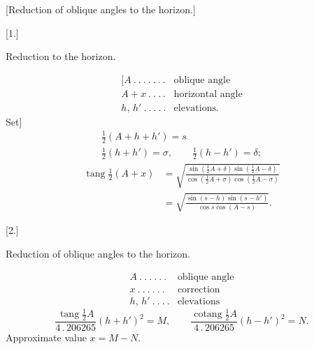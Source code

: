 \par\clearpage\null\clearpage
\begin{center}
{\Large\textbf{}}\par\bigskip
{\large [Reduction of oblique angles to the horizon.]}\par\bigskip
{[}1.]\par\medskip
{\large Reduction to the horizon.}
\end{center}
\[
\begin{array}{ll}
{[}A\ .\ .\ .\ .\ .\ .\ .&\text{oblique angle}\\
A+x\ .\ .\ .\ .&\text{horizontal angle}\\
h,\,h'\ .\ .\ .\ .\ .&\text{elevations.}
\end{array}
\]
\noindent Set]
\[
\begin{gathered}
\tfrac12(A+h+h')=s\\
\tfrac12(h+h')=\sigma,\qquad\tfrac12(h-h')=\delta;
\end{gathered}
\]
\noindent [then]
\[
\begin{aligned}
\operatorname{tang}\tfrac12(A+x)
&=\sqrt{\frac{\sin(\frac12A+\delta)\sin(\frac12A-\delta)}{\cos(\frac12A+\sigma)\cos(\frac12A-\sigma)}}\\
&=\sqrt{\frac{\sin(s-h)\sin(s-h')}{\cos s\cos(A-s)}}.
\end{aligned}
\]
\begin{center}[2.]\par\medskip
{\large Reduction of oblique angles to the horizon.}\end{center}
\[
\begin{array}{ll}
A\ .\ .\ .\ .\ .\ .&\text{oblique angle}\\
x\ .\ .\ .\ .\ .\ .&\text{correction}\\
h,\,h'\ .\ .\ .\ .&\text{elevations}
\end{array}
\]
\[
\frac{\operatorname{tang}\frac12A}{4\,.\,206265}(h+h')^2=M,\qquad
\frac{\operatorname{cotang}\frac12A}{4\,.\,206265}(h-h')^2=N.
\]
\noindent Approximate value $x=M-N$.

